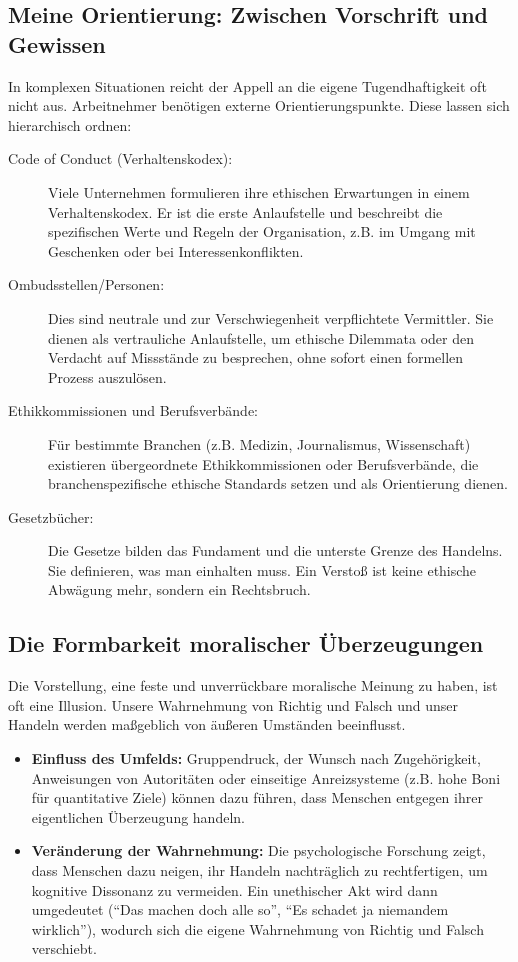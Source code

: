 \documentclass[
    12pt,               %
    a4paper,            %
    ngerman             %
]{scrartcl}
\begin{document}
\subsection{Meine Orientierung: Zwischen Vorschrift und Gewissen}
In komplexen Situationen reicht der Appell an die eigene Tugendhaftigkeit oft nicht aus. Arbeitnehmer benötigen externe Orientierungspunkte. Diese lassen sich hierarchisch ordnen:

\begin{description}
    \item[Code of Conduct (Verhaltenskodex):] Viele Unternehmen formulieren ihre ethischen Erwartungen in einem Verhaltenskodex. Er ist die erste Anlaufstelle und beschreibt die spezifischen Werte und Regeln der Organisation, z.B. im Umgang mit Geschenken oder bei Interessenkonflikten.
    \item[Ombudsstellen/Personen:] Dies sind neutrale und zur Verschwiegenheit verpflichtete Vermittler. Sie dienen als vertrauliche Anlaufstelle, um ethische Dilemmata oder den Verdacht auf Missstände zu besprechen, ohne sofort einen formellen Prozess auszulösen.
    \item[Ethikkommissionen und Berufsverbände:] Für bestimmte Branchen (z.B. Medizin, Journalismus, Wissenschaft) existieren übergeordnete Ethikkommissionen oder Berufsverbände, die branchenspezifische ethische Standards setzen und als Orientierung dienen.
    \item[Gesetzbücher:] Die Gesetze bilden das Fundament und die unterste Grenze des Handelns. Sie definieren, was man einhalten muss. Ein Verstoß ist keine ethische Abwägung mehr, sondern ein Rechtsbruch.
\end{description}

\subsection{Die Formbarkeit moralischer Überzeugungen}
Die Vorstellung, eine feste und unverrückbare moralische Meinung zu haben, ist oft eine Illusion. Unsere Wahrnehmung von Richtig und Falsch und unser Handeln werden maßgeblich von äußeren Umständen beeinflusst.

\begin{itemize} %
    \item \textbf{Einfluss des Umfelds:} Gruppendruck, der Wunsch nach Zugehörigkeit, Anweisungen von Autoritäten oder einseitige Anreizsysteme (z.B. hohe Boni für quantitative Ziele) können dazu führen, dass Menschen entgegen ihrer eigentlichen Überzeugung handeln.
    \item \textbf{Veränderung der Wahrnehmung:} Die psychologische Forschung zeigt, dass Menschen dazu neigen, ihr Handeln nachträglich zu rechtfertigen, um kognitive Dissonanz zu vermeiden. Ein unethischer Akt wird dann umgedeutet (\enquote{Das machen doch alle so}, \enquote{Es schadet ja niemandem wirklich}), wodurch sich die eigene Wahrnehmung von Richtig und Falsch verschiebt.
\end{itemize}
\end{document}
